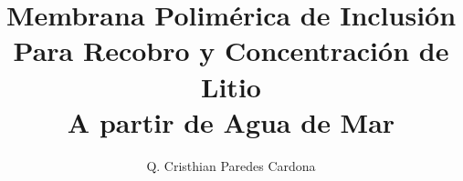 \documentclass[twoside]{umCris}  %
\title{Membrana Polimérica de Inclusión\\Para Recobro y Concentración de Litio\\A partir de Agua de Mar}  %
\author{Q. Cristhian Paredes Cardona}                           %
\begin{document}

\renewcommand{\tablename}{Tabla}
\renewcommand{\figurename}{Figura}
\renewcommand{\indexname}{Índice}
\newcommand{\ChapBib}[1]{{\footnotesize}}


\frontmatter 
    \maketitle
        \emergencystretch=10pt
    \begin{copyrightenv}\end{copyrightenv}
    \begin{juries}\end{juries}
    \if@openright\cleardoublepage\else\clearpage\fi
    \tableofcontents*\if@openright\cleardoublepage\else\clearpage\fi
    \listoffigures*\if@openright\cleardoublepage\else\clearpage\fi
    \listoftables*\if@openright\cleardoublepage\else\clearpage\fi
    \if@openright\cleardoublepage\else\clearpage\fi

\pagestyle{umpage}
\mainmatter 
\linenumbers
    
    
    
    
    
    
    
    \appendix
        
        
         
        
        
        

{\backmatter
}
\end{document}
